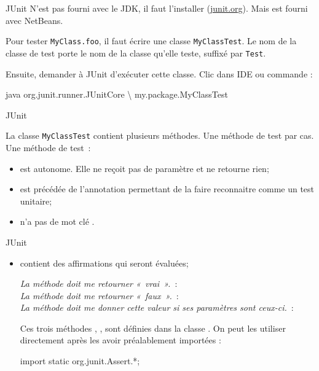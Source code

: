 \begin{hideedit}
\begin{frame}[fragile]{JUnit}
  \pause
  N'est pas fourni avec le JDK, il faut l'installer
  (\href{http://junit.org}{junit.org}). Mais est fourni avec NetBeans.

  \pause
  Pour tester \texttt{MyClass.foo},
  il faut écrire une classe \texttt{MyClassTest}.
  Le nom de la classe de test porte le nom de la classe qu'elle teste,
  suffixé par \texttt{Test}.

  Ensuite, demander à JUnit d'exécuter
  cette classe. Clic dans IDE ou commande :
  \begin{term}
java org.junit.runner.JUnitCore \textbackslash
    my.package.MyClassTest
\end{term}
\end{frame}

\begin{frame}[fragile]{JUnit}

  La classe \texttt{MyClassTest} contient plusieurs méthodes. Une méthode de test
  par cas. Une méthode de test~:
  \begin{itemize}
    \item est autonome. Elle ne reçoit pas de paramètre et ne retourne rien;
    \item est précédée de l'annotation  permettant de la faire
          reconnaitre comme un test unitaire;

    \item n'a pas de mot clé .
    \end{itemize}
\end{frame}

\begin{frame}[fragile]{JUnit}
  \begin{itemize}
    \item contient des affirmations qui seront évaluées;

      \textit{La méthode doit me retourner «~vrai~».}~: \\
      \textit{La méthode doit me retourner «~faux~».}~: \\
      \textit{La méthode doit me donner cette valeur si ses paramètres sont
      ceux-ci.}~:\\

                Ces trois méthodes , ,  sont définies dans la classe .
                On peut les utiliser directement après les avoir préalablement importées :
\begin{java}
import static org.junit.Assert.*;
\end{java}
  \end{itemize}
\end{frame}

\end{hideedit}
